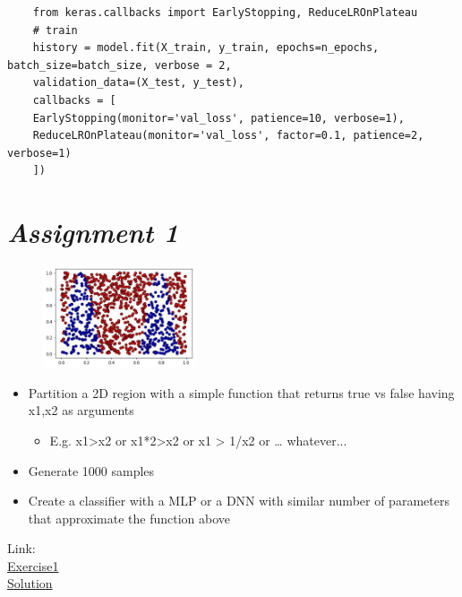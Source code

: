 \begin{verbatim}
	from keras.callbacks import EarlyStopping, ReduceLROnPlateau
	# train
	history = model.fit(X_train, y_train, epochs=n_epochs, batch_size=batch_size, verbose = 2,
	validation_data=(X_test, y_test),
	callbacks = [
	EarlyStopping(monitor='val_loss', patience=10, verbose=1),
	ReduceLROnPlateau(monitor='val_loss', factor=0.1, patience=2, verbose=1)
	])
\end{verbatim}

\section{\textit{Assignment 1}}

\begin{figure}
	\includegraphics[width=0.4\textwidth]{figure_ml/ass1.png}
\end{figure} 
\quad
\begin{itemize}
	\item Partition a 2D region with a simple function that returns true vs false having x1,x2 as arguments
	\begin{itemize}
		\item E.g. x1>x2 or x1*2>x2 or x1 > 1/x2 or … whatever...
	\end{itemize}
	\item Generate 1000 samples
	\item Create a classifier with a MLP or a DNN with similar number of parameters that approximate the function above
\end{itemize}
Link: \\
\href{https://colab.research.google.com/drive/1OOZIT1AFV7IaHajrruOJ6AmZeZkGeBJa?usp=sharing}{Exercise1}\\
\href{https://colab.research.google.com/drive/1ghow_mdPfIOPkALZAS2ubUxIUFRwhotS?usp=sharing}{Solution}


